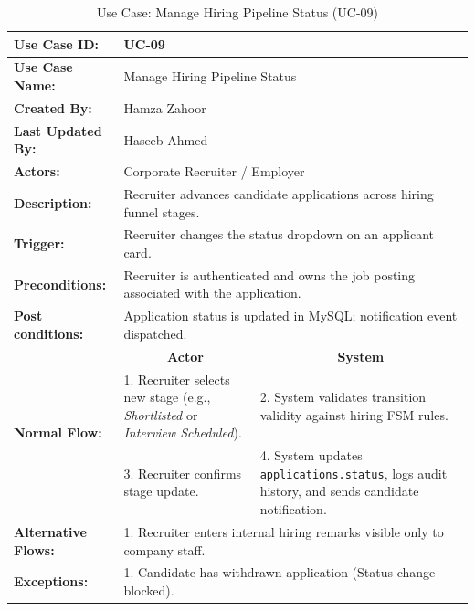 \begin{table}[H]
\centering
\small
\caption{Use Case: Manage Hiring Pipeline Status (UC-09)}
\label{tab:uc09_spec}
\begin{tabular}{|p{3.2cm}|p{5.5cm}|p{5.5cm}|}
\hline
\textbf{Use Case ID:} & \multicolumn{2}{p{11.4cm}|}{UC-09} \\ \hline
\textbf{Use Case Name:} & \multicolumn{2}{p{11.4cm}|}{Manage Hiring Pipeline Status} \\ \hline
\textbf{Created By:} & \multicolumn{2}{p{11.4cm}|}{Hamza Zahoor} \\ \hline
\textbf{Last Updated By:} & \multicolumn{2}{p{11.4cm}|}{Haseeb Ahmed} \\ \hline
\textbf{Actors:} & \multicolumn{2}{p{11.4cm}|}{Corporate Recruiter / Employer} \\ \hline
\textbf{Description:} & \multicolumn{2}{p{11.4cm}|}{Recruiter advances candidate applications across hiring funnel stages.} \\ \hline
\textbf{Trigger:} & \multicolumn{2}{p{11.4cm}|}{Recruiter changes the status dropdown on an applicant card.} \\ \hline
\textbf{Preconditions:} & \multicolumn{2}{p{11.4cm}|}{Recruiter is authenticated and owns the job posting associated with the application.} \\ \hline
\textbf{Post conditions:} & \multicolumn{2}{p{11.4cm}|}{Application status is updated in MySQL; notification event dispatched.} \\ \hline
\multirow{3}{*}{\textbf{Normal Flow:}} & \multicolumn{1}{c|}{\textbf{Actor}} & \multicolumn{1}{c|}{\textbf{System}} \\ \cline{2-3}
& 1. Recruiter selects new stage (e.g., \textit{Shortlisted} or \textit{Interview Scheduled}). & 2. System validates transition validity against hiring FSM rules. \vspace{2pt} \\
& 3. Recruiter confirms stage update. & 4. System updates \texttt{applications.status}, logs audit history, and sends candidate notification. \\ \hline
\textbf{Alternative Flows:} & \multicolumn{2}{p{11.4cm}|}{1. Recruiter enters internal hiring remarks visible only to company staff.} \\ \hline
\textbf{Exceptions:} & \multicolumn{2}{p{11.4cm}|}{1. Candidate has withdrawn application (Status change blocked).} \\ \hline
\end{tabular}
\end{table}

